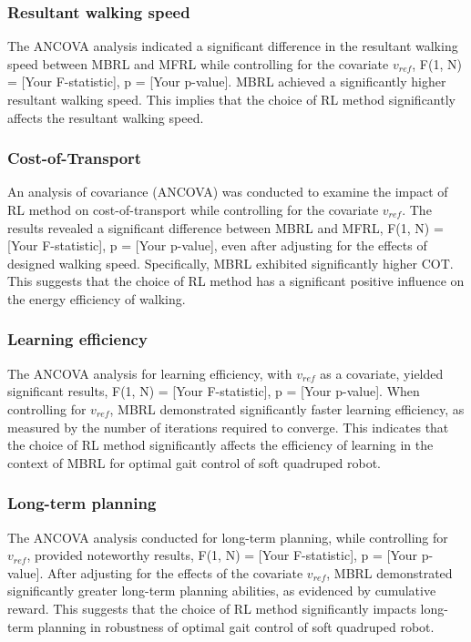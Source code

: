\subsubsection*{Resultant walking speed}
The ANCOVA analysis indicated a significant difference in the resultant walking speed between MBRL and MFRL while controlling for the covariate $v_{ref}$, F(1, N) = [Your F-statistic], p = [Your p-value]. MBRL achieved a significantly higher resultant walking speed. This implies that the choice of RL method significantly affects the resultant walking speed.
\subsubsection{Cost-of-Transport}
An analysis of covariance (ANCOVA) was conducted to examine the impact of RL method on cost-of-transport while controlling for the covariate $v_{ref}$. The results revealed a significant difference between MBRL and MFRL, F(1, N) = [Your F-statistic], p = [Your p-value], even after adjusting for the effects of designed walking speed. Specifically, MBRL exhibited significantly higher \ac{COT}. This suggests that the choice of RL method has a significant positive influence on the energy efficiency of walking.
\subsubsection{Learning efficiency}
The ANCOVA analysis for learning efficiency, with $v_{ref}$ as a covariate, yielded significant results, F(1, N) = [Your F-statistic], p = [Your p-value]. When controlling for $v_{ref}$, MBRL demonstrated significantly faster learning efficiency, as measured by the number of iterations required to converge. This indicates that the choice of RL method significantly affects the efficiency of learning in the context of MBRL for optimal gait control of soft quadruped robot.
\subsubsection*{Long-term planning}
The ANCOVA analysis conducted for long-term planning, while controlling for $v_{ref}$, provided noteworthy results, F(1, N) = [Your F-statistic], p = [Your p-value]. After adjusting for the effects of the covariate $v_{ref}$, MBRL demonstrated significantly greater long-term planning abilities, as evidenced by cumulative reward. This suggests that the choice of RL method significantly impacts long-term planning in robustness of optimal gait control of soft quadruped robot. 

